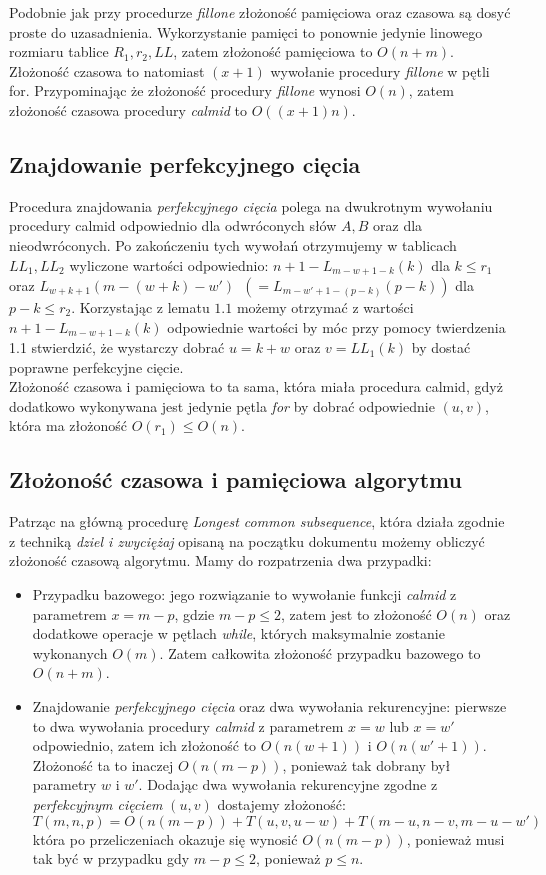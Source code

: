 \documentclass[12pt]{article}
\theoremstyle{definition}
\theoremstyle{definition}
\theoremstyle{definition}
\begin{document}
Podobnie jak przy procedurze \textit{fillone} złożoność pamięciowa oraz czasowa są dosyć proste do uzasadnienia.
Wykorzystanie pamięci to ponownie jedynie linowego rozmiaru tablice $R_1, r_2, LL$, zatem złożoność pamięciowa to $O(n + m)$.\\
Złożoność czasowa to natomiast $(x + 1)$ wywołanie procedury \textit{fillone} w pętli for. Przypominając że złożoność procedury \textit{fillone} wynosi $O(n)$, zatem złożoność czasowa procedury \textit{calmid} to $O((x+1)n)$.

\subsection{Znajdowanie perfekcyjnego cięcia}

Procedura znajdowania \textit{perfekcyjnego cięcia} polega na dwukrotnym wywołaniu procedury calmid odpowiednio dla odwróconych słów $A, B$ oraz dla nieodwróconych. Po zakończeniu tych wywołań otrzymujemy w tablicach $LL_1, LL_2$ wyliczone wartości odpowiednio: $n + 1 - L_{m-w+1-k}(k)$ dla $k \leq r_1$ oraz $L_{w+k+1}(m-(w+k)-w')$\ $(= L_{m-w'+1-(p-k)}(p-k))$ dla $p-k \leq r_2$. Korzystając z lematu $1.1$ możemy otrzymać z wartości $n + 1 - L_{m-w+1-k}(k)$ odpowiednie wartości by móc przy pomocy twierdzenia 1.1 stwierdzić, że wystarczy dobrać $u = k + w$ oraz $v = LL_1(k)$ by dostać poprawne perfekcyjne cięcie.\\
Złożoność czasowa i pamięciowa to ta sama, która miała procedura calmid, gdyż dodatkowo wykonywana jest jedynie pętla \textit{for} by dobrać odpowiednie $(u, v)$, która ma złożoność $O(r_1) \leq O(n)$.

\subsection{Złożoność czasowa i pamięciowa algorytmu}
Patrząc na główną procedurę \textit{Longest common subsequence}, która działa zgodnie z techniką \textit{dziel i zwyciężaj} opisaną na początku dokumentu możemy obliczyć złożoność czasową algorytmu.
Mamy do rozpatrzenia dwa przypadki:
\begin{itemize}
    \item Przypadku bazowego: jego rozwiązanie to wywołanie funkcji \textit{calmid} z parametrem $x = m-p$, gdzie $m - p \leq 2$, zatem jest to złożoność $O(n)$ oraz dodatkowe operacje w pętlach \textit{while}, których maksymalnie zostanie wykonanych $O(m)$. Zatem całkowita złożoność przypadku bazowego to $O(n + m)$.
    \item Znajdowanie \textit{perfekcyjnego cięcia} oraz dwa wywołania rekurencyjne: pierwsze to dwa wywołania procedury \textit{calmid} z parametrem $x = w$ lub $x = w'$ odpowiednio, zatem ich złożoność to $O(n(w + 1))$ i $O(n(w' + 1))$. Złożoność ta to inaczej $O(n(m - p))$, ponieważ tak dobrany był parametry $w$ i $w'$. Dodając dwa wywołania rekurencyjne zgodne z \textit{perfekcyjnym cięciem} $(u, v)$ dostajemy złożoność:
    \[
        T(m, n, p) = O(n(m - p)) + T(u, v, u - w) + T(m - u, n - v, m - u - w')
    \]
    która po przeliczeniach okazuje się wynosić $O(n(m - p))$, ponieważ musi tak być w przypadku gdy $m-p \leq 2$, ponieważ $p \leq n$.
\end{itemize}
\end{document}
